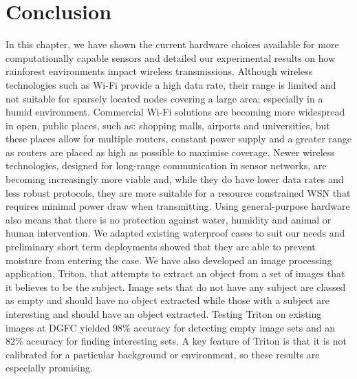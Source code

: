 \section{Conclusion}\label{tech:conc}
	In this chapter, we have shown the current hardware choices available for more computationally capable sensors and detailed our experimental results on how rainforest environments impact wireless transmissions. Although wireless technologies such as Wi-Fi provide a high data rate, their range is limited and not suitable for sparsely located nodes covering a large area; especially in a humid environment. Commercial Wi-Fi solutions are becoming more widespread in open, public places, such as: shopping malls, airports and universities, but these places allow for multiple routers, constant power supply and a greater range as routers are placed as high as possible to maximise coverage.
	Newer wireless technologies, designed for long-range communication in sensor networks, are becoming increasingly more viable and, while they do have lower data rates and less robust protocols, they are more suitable for a resource constrained WSN that requires minimal power draw when transmitting. 
	Using general-purpose hardware also means that there is no protection against water, humidity and animal or human intervention. We adapted existing waterproof cases to suit our needs and preliminary short term deployments showed that they are able to prevent moisture from entering the case.
	We have also developed an image processing application, Triton, that attempts to extract an object from a set of images that it believes to be the subject. Image sets that do not have any subject are classed as empty and should have no object extracted while those with a subject are interesting and should have an object extracted. Testing Triton on existing images at DGFC yielded 98\% accuracy for detecting empty image sets and an 82\% accuracy for finding interesting sets. A key feature of Triton is that it is not calibrated for a particular background or environment, so these results are especially promising.
	 
